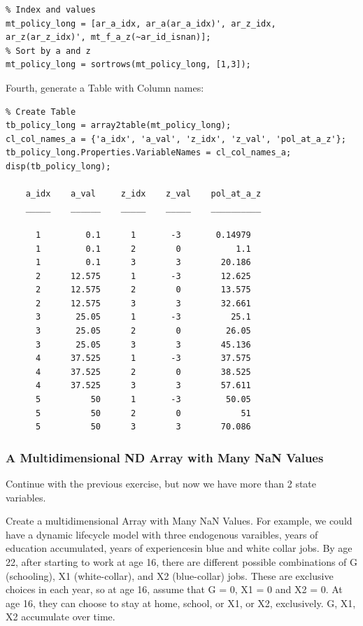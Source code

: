\documentclass[
]{book}
\begin{document}
\begin{verbatim}
% Index and values
mt_policy_long = [ar_a_idx, ar_a(ar_a_idx)', ar_z_idx, ar_z(ar_z_idx)', mt_f_a_z(~ar_id_isnan)];
% Sort by a and z
mt_policy_long = sortrows(mt_policy_long, [1,3]);
\end{verbatim}

Fourth, generate a Table with Column names:

\begin{verbatim}
% Create Table
tb_policy_long = array2table(mt_policy_long);
cl_col_names_a = {'a_idx', 'a_val', 'z_idx', 'z_val', 'pol_at_a_z'};
tb_policy_long.Properties.VariableNames = cl_col_names_a;
disp(tb_policy_long);

    a_idx    a_val     z_idx    z_val    pol_at_a_z
    _____    ______    _____    _____    __________

      1         0.1      1       -3       0.14979  
      1         0.1      2        0           1.1  
      1         0.1      3        3        20.186  
      2      12.575      1       -3        12.625  
      2      12.575      2        0        13.575  
      2      12.575      3        3        32.661  
      3       25.05      1       -3          25.1  
      3       25.05      2        0         26.05  
      3       25.05      3        3        45.136  
      4      37.525      1       -3        37.575  
      4      37.525      2        0        38.525  
      4      37.525      3        3        57.611  
      5          50      1       -3         50.05  
      5          50      2        0            51  
      5          50      3        3        70.086  
\end{verbatim}

\hypertarget{a-multidimensional-nd-array-with-many-nan-values}{%
\subsubsection{A Multidimensional ND Array with Many NaN Values}\label{a-multidimensional-nd-array-with-many-nan-values}}

Continue with the previous exercise, but now we have more than 2 state
variables.

Create a multidimensional Array with Many NaN Values. For example, we
could have a dynamic lifecycle model with three endogenous varaibles,
years of education accumulated, years of experiencesin blue and white
collar jobs. By age 22, after starting to work at age 16, there are
different possible combinations of G (schooling), X1 (white-collar), and
X2 (blue-collar) jobs. These are exclusive choices in each year, so at
age 16, assume that G = 0, X1 = 0 and X2 = 0. At age 16, they can choose
to stay at home, school, or X1, or X2, exclusively. G, X1, X2 accumulate
over time.
\end{document}
